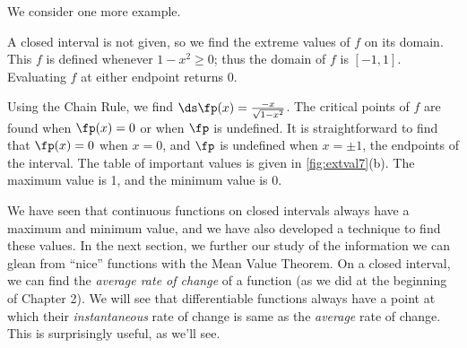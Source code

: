 We consider one more example.

{A closed interval is not given, so we find the extreme values of $f$ on its domain. This $f$ is defined whenever $1-x^2\geq 0$; thus the domain of $f$ is $[-1,1]$. Evaluating $f$ at either endpoint returns 0.

Using the Chain Rule, we find $\ds \fp(x) = \frac{-x}{\sqrt{1-x^2}}$. The critical points of $f$ are found when $\fp(x) = 0$ or when $\fp$ is undefined. It is straightforward to find that $\fp(x) = 0$ when $x=0$, and $\fp$ is undefined when $x=\pm 1$, the endpoints of the interval. The table of important values is given in \autoref{fig:extval7}(b). The maximum value is 1, and the minimum value is 0.}


We have seen that continuous functions on closed intervals always have a maximum and minimum value, and we have also developed a technique to find these values. In the next section, we further our study of the information we can glean from ``nice'' functions with the Mean Value Theorem. On a closed interval, we can find the \textit{average rate of change} of a function (as we did at the beginning of Chapter 2). We will see that differentiable functions always have a point at which their \textit{instantaneous} rate of change is same as the \textit{average} rate of change. This is surprisingly useful, as we'll see.

